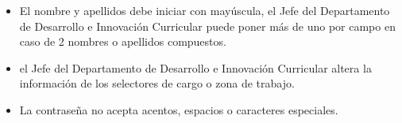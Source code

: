 \begin{itemize}
	\begin{itemize}
		\item El nombre y apellidos debe iniciar con mayúscula, el Jefe del Departamento de Desarrollo e Innovación Curricular puede poner más de uno por campo en caso de 2 nombres o apellidos compuestos.
		\item el Jefe del Departamento de Desarrollo e Innovación Curricular altera la información de los selectores de cargo o zona de trabajo.
		\item La contraseña no acepta acentos, espacios o caracteres especiales.
	\end{itemize}
\end{itemize}